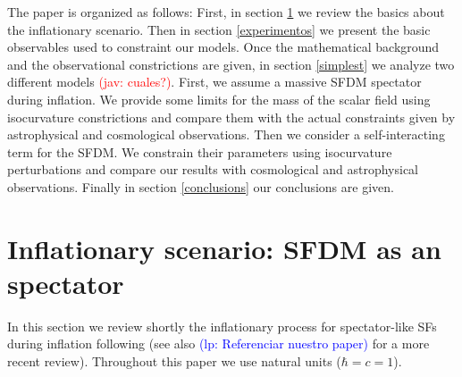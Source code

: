 \documentclass[amssymb,twocolumn,prd,nofootinbib,showpacs]{revtex4-1}
\newcommand{\jav}[1]{\textcolor{red}{(jav: #1)}}
\newcommand{\lp}[1]{\textcolor{blue}{(lp: #1)}}
\begin{document}
The paper is organized as follows: First, in section \ref{Generalities} we review the basics about the inflationary scenario. 
Then in section \ref{experimentos} we present the basic  observables used to constraint our models. 
Once the mathematical background and the observational constrictions are given, in section \ref{simplest} we 
analyze two different models \jav{cuales?}. 
First, we assume a massive SFDM spectator during inflation. We provide some limits for the  
mass of the scalar field using isocurvature constrictions and compare them with the actual constraints given by 
astrophysical and cosmological observations. 
 Then we consider a self-interacting term for the SFDM. We constrain their parameters using 
 isocurvature perturbations and compare our results with cosmological and astrophysical 
 observations. Finally in section \ref{conclusions} our conclusions are given.      

\section{Inflationary scenario: SFDM as an spectator}\label{Generalities}


In this section we review shortly the inflationary process for spectator-like SFs during 
inflation following \cite{twofields} (see also \lp{Referenciar nuestro paper} for a more recent review). 
Throughout this paper we use natural units ($\hbar=c=1$).
\end{document}
